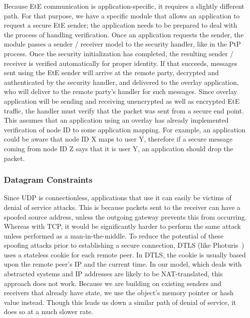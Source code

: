 \documentclass[conference]{IEEEtran}
\begin{document}
Because EtE communication is application-specific, it requires
a slightly different path.  For that purpose, we have a specific module that
allows an application to request a secure EtE sender; the application needs to be prepared to deal with the
process of handling verification.  Once an application requests the sender, the
module passes a sender / receiver model to the security handler, like in the PtP
process.  Once the security initialization has completed, the
resulting sender / receiver is verified automatically for proper identity.
If that succeeds, messages sent using the EtE sender will arrive at the remote
party, decrypted and authenticated by the security handler, and delivered to the
overlay application, who will deliver to the remote party's handler for such messages.
Since overlay application will be sending and receiving
unencrypted as well as encrypted EtE traffic, the handler must verify that the
packet was sent from a secure end point.  This assumes that an application using
an overlay has already implemented verification of node ID to some application
mapping.  For example, an application could be aware that node ID X maps to user
Y, therefore if a secure message coming from node ID Z says that it is user Y,
an application should drop the packet.

\subsubsection{Datagram Constraints}
Since UDP is connectionless, applications that use it can easily be victims of
denial of service attacks.  This is because packets sent to the receiver can
have a spoofed source address, unless the outgoing gateway prevents this from
occurring.  Whereas with TCP, it would be significantly harder to perform the
same attack unless performed as a man-in-the-middle.  To reduce the potential
of these spoofing attacks prior to establishing a secure connection, DTLS (like
Photuris~\cite{photuris}) uses a stateless cookie for each remote peer.  In
DTLS, the cookie is usually based upon the remote peer's IP and the current
time.  In our model, which deals with abstracted systems and IP addresses are
likely to be NAT-translated, this approach does not work.  Because we are
building on existing senders and receivers that already have state, we use the
object's memory pointer or hash value instead.  Though this leads us down a
similar path of denial of service, it does so at a much slower rate.
\end{document}
